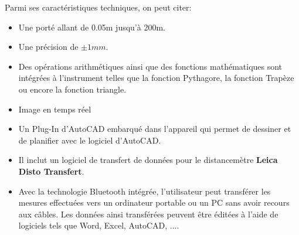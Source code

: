 \documentclass[a4paper, 12pt]{book}
\begin{document}
\begin{description}
 Parmi ses caractéristiques techniques, on peut citer:
	\begin{itemize}
		\item Une porté allant de 0.05m jusqu'à 200m.
		\item Une précision de $\pm 1mm$.
		\item Des opérations arithmétiques ainsi que des fonctions mathématiques sont intégrées à l'instrument telles que la fonction Pythagore, la fonction Trapèze ou encore la fonction triangle.
		\item Image en temps réel 
		\item Un Plug-In d'AutoCAD embarqué dans l'appareil qui permet de dessiner et de planifier avec le logiciel d'AutoCAD.
		\item Il inclut un logiciel de transfert de données pour le distancemètre  \textbf{Leica Disto Transfert}.
		\item Avec la technologie Bluetooth intégrée, l'utilisateur peut transférer les mesures effectuées vers un ordinateur portable ou un PC sans avoir recours aux câbles. Les données ainsi transférées peuvent être éditées à l'aide de logiciels tels que Word, Excel, AutoCAD, ....
	\end{itemize}
\end{description}
\end{document}
